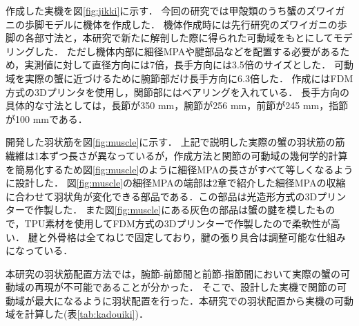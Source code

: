 \documentclass{jarticle}
\begin{document}
作成した実機を図\ref{fig:jikki}に示す．
今回の研究では甲殻類のうち蟹のズワイガニの歩脚モデルに機体を作成した．
機体作成時には先行研究\cite{crabrobot2}のズワイガニの歩脚の各部寸法と，本研究で新たに解剖した際に得られた可動域をもとにしてモデリングした．
ただし機体内部に細径MPAや腱部品などを配置する必要があるため，実測値に対して直径方向には7倍，長手方向には3.5倍のサイズとした．
可動域を実際の蟹に近づけるために腕節部だけ長手方向に6.3倍した．
作成にはFDM方式の3Dプリンタを使用し，関節部にはベアリングを入れている．
長手方向の具体的な寸法としては，長節が350 mm，腕節が256 mm，前節が245 mm，指節が100 mmである．

開発した羽状筋を図\ref{fig:muscle}に示す．
上記で説明した実際の蟹の羽状筋の筋繊維は1本ずつ長さが異なっているが，作成方法と関節の可動域の幾何学的計算を簡易化するため図\ref{fig:muscle}のように細径MPAの長さがすべて等しくなるように設計した．
図\ref{fig:muscle}の細径MPAの端部は2章で紹介した細径MPAの収縮に合わせて羽状角が変化できる部品である．この部品は光造形方式の3Dプリンターで作製した．
また図\ref{fig:muscle}にある灰色の部品は蟹の腱を模したもので，TPU素材を使用してFDM方式の3Dプリンターで作製したので柔軟性が高い．
腱と外骨格は全てねじで固定しており，腱の張り具合は調整可能な仕組みになっている．

本研究の羽状筋配置方法では，腕節-前節間と前節-指節間において実際の蟹の可動域の再現が不可能であることが分かった．
そこで、設計した実機で関節の可動域が最大になるように羽状配置を行った．本研究での羽状配置から実機の可動域を計算した(表\ref{tab:kadouiki})．

\end{document}
